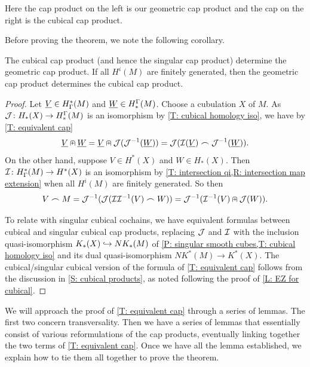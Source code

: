 Here the cap product on the left is our geometric cap product and the cap on the right is the cubical cap product.

Before proving the theorem, we note the following corollary.

\begin{corollary}\label{C: cap relation}
	The cubical cap product (and hence the singular cap product) determine the geometric cap product.
	If all $H^i(M)$ are finitely generated, then the geometric cap product determines the cubical cap product.
\end{corollary}

\begin{proof}
	Let $\underline{V} \in H^*_\Gamma(M)$ and $\underline{W} \in H_*^\Gamma(M)$.
	Choose a cubulation $X$ of $M$.
	As $\mathcal{J} \colon H_*(X) \to H_*^\Gamma(M)$ is an isomorphism by \cref{T: cubical homology iso}, we have by \cref{T: equivalent cap}
	$$\underline{V}\nplus \underline{W} = \underline{V}\nplus \mathcal{J}(\mathcal{J}^{-1}(\underline{W})) = \mathcal{J}(\mathcal{I}(\underline{V})\frown \mathcal{J}^{-1}(\underline{W})).$$
	On the other hand, suppose $V \in H^*(X)$ and $W \in H_*(X)$.
	Then $\mathcal{I} \colon H^*_\Gamma(M) \to H^*(X)$ is an isomorphism by \cref{T: intersection qi,R: intersection map extension} when all $H^i(M)$ are finitely generated.
	So then
	$$V\frown M = \mathcal{J}^{-1}(\mathcal{J}(\mathcal{I}\mathcal{I}^{-1}(V)\frown W)) = \mathcal{J}^{-1}(\mathcal{I}^{-1}(V) \nplus \mathcal{J}(W)).$$

	To relate with singular cubical cochains, we have equivalent formulas between cubical and singular cubical cap products, replacing $\mathcal{J}$ and $\mathcal{I}$ with the inclusion quasi-isomorphism $K_*(X) \hookrightarrow NK_*(M)$ of \cref{P: singular smooth cubes,T: cubical homology iso} and its dual quasi-isomorphism $NK^*(M) \to K^*(X)$.
	The cubical/singular cubical version of the formula of \cref{T: equivalent cap} follows from the discussion in \cref{S: cubical products}, as noted following the proof of \cref{L: EZ for cubical}.
\end{proof}

We will approach the proof of \cref{T: equivalent cap} through a series of lemmas.
The first two concern transversality.
Then we have a series of lemmas that essentially consist of various reformulations of the cap products, eventually linking together the two terms of \cref{T: equivalent cap}.
Once we have all the lemma established, we explain how to tie them all together to prove the theorem.

